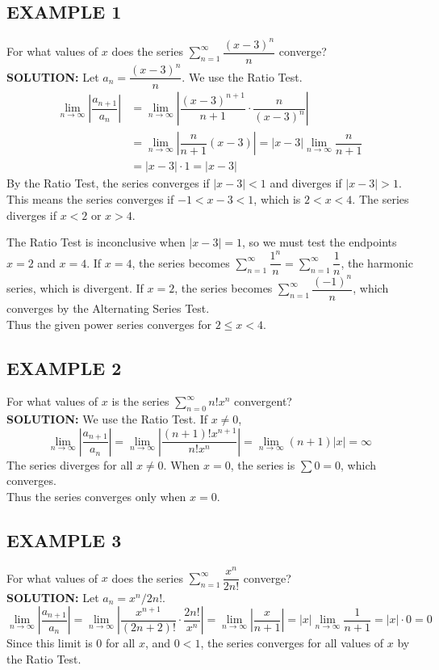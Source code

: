 \documentclass{article}
\theoremstyle{mystyle}
\begin{document}
\subsection*{EXAMPLE 1}
For what values of \(x\) does the series \( \sum_{n=1}^{\infty} \dfrac{(x-3)^n}{n} \) converge?\\
\textbf{SOLUTION:}
Let \(a_n = \dfrac{(x-3)^n}{n}\). We use the Ratio Test.
\begin{align*}
    \lim_{n\to\infty} \left| \dfrac{a_{n+1}}{a_n} \right| &= \lim_{n\to\infty} \left| \dfrac{(x-3)^{n+1}}{n+1} \cdot \dfrac{n}{(x-3)^n} \right| \\
    &= \lim_{n\to\infty} \left| \dfrac{n}{n+1} (x-3) \right| = |x-3| \lim_{n\to\infty} \dfrac{n}{n+1} \\
    &= |x-3| \cdot 1 = |x-3|
\end{align*}
By the Ratio Test, the series converges if \(|x-3| < 1\) and diverges if \(|x-3| > 1\). This means the series converges if \(-1 < x-3 < 1\), which is \(2 < x < 4\). The series diverges if \(x < 2\) or \(x > 4\).

The Ratio Test is inconclusive when \(|x-3| = 1\), so we must test the endpoints \(x=2\) and \(x=4\).
If \(x=4\), the series becomes \( \sum_{n=1}^\infty \dfrac{1^n}{n} = \sum_{n=1}^\infty \dfrac{1}{n} \), the harmonic series, which is divergent.
If \(x=2\), the series becomes \( \sum_{n=1}^\infty \dfrac{(-1)^n}{n} \), which converges by the Alternating Series Test.\\
Thus the given power series converges for \(2 \le x < 4\).

\subsection*{EXAMPLE 2}
For what values of \(x\) is the series \( \sum_{n=0}^{\infty} n! x^n \) convergent?\\
\textbf{SOLUTION:}
We use the Ratio Test. If \(x \neq 0\),
\[ \lim_{n\to\infty} \left| \dfrac{a_{n+1}}{a_n} \right| = \lim_{n\to\infty} \left| \dfrac{(n+1)! x^{n+1}}{n! x^n} \right| = \lim_{n\to\infty} (n+1)|x| = \infty \]
The series diverges for all \(x \neq 0\). When \(x=0\), the series is \( \sum 0 = 0 \), which converges.\\
Thus the series converges only when \(x=0\).

\subsection*{EXAMPLE 3}
For what values of \(x\) does the series \( \sum_{n=1}^{\infty} \dfrac{x^n}{2n!} \) converge?\\
\textbf{SOLUTION:}
Let \(a_n = x^n/2n!\).
\[ \lim_{n\to\infty} \left| \dfrac{a_{n+1}}{a_n} \right| = \lim_{n\to\infty} \left| \dfrac{x^{n+1}}{(2n+2)!} \cdot \dfrac{2n!}{x^n} \right| = \lim_{n\to\infty} \left| \dfrac{x}{n+1} \right| = |x| \lim_{n\to\infty} \dfrac{1}{n+1} = |x| \cdot 0 = 0 \]
Since this limit is 0 for all \(x\), and \(0 < 1\), the series converges for all values of \(x\) by the Ratio Test.\\
\end{document}
